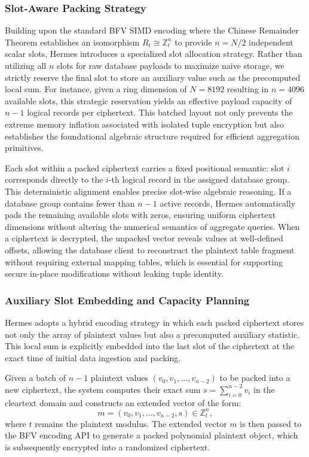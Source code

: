 \documentclass[sigconf,nonacm]{acmart}
\begin{document}
\subsubsection{Slot-Aware Packing Strategy}

Building upon the standard BFV SIMD encoding where the Chinese Remainder Theorem establishes an isomorphism $R_t \cong \mathbb{Z}_t^n$ to provide $n = N/2$ independent scalar slots, Hermes introduces a specialized slot allocation strategy. Rather than utilizing all $n$ slots for raw database payloads to maximize naive storage, we strictly reserve the final slot to store an auxiliary value such as the precomputed local sum. For instance, given a ring dimension of $N=8192$ resulting in $n=4096$ available slots, this strategic reservation yields an effective payload capacity of $n-1$ logical records per ciphertext. This batched layout not only prevents the extreme memory inflation associated with isolated tuple encryption but also establishes the foundational algebraic structure required for efficient aggregation primitives.

Each slot within a packed ciphertext carries a fixed positional semantic: slot $i$ corresponds directly to the $i$-th logical record in the assigned database group. This deterministic alignment enables precise slot-wise algebraic reasoning. If a database group contains fewer than $n-1$ active records, Hermes automatically pads the remaining available slots with zeros, ensuring uniform ciphertext dimensions without altering the numerical semantics of aggregate queries. When a ciphertext is decrypted, the unpacked vector reveals values at well-defined offsets, allowing the database client to reconstruct the plaintext table fragment without requiring external mapping tables, which is essential for supporting secure in-place modifications without leaking tuple identity.

\subsubsection{Auxiliary Slot Embedding and Capacity Planning}

Hermes adopts a hybrid encoding strategy in which each packed ciphertext stores not only the array of plaintext values but also a precomputed auxiliary statistic. This local sum is explicitly embedded into the last slot of the ciphertext at the exact time of initial data ingestion and packing.

Given a batch of $n-1$ plaintext values $(v_0, v_1, \dots, v_{n-2})$ to be packed into a new ciphertext, the system computes their exact sum $s = \sum_{i=0}^{n-2} v_i$ in the cleartext domain and constructs an extended vector of the form:
\[
m = (v_0, v_1, \dots, v_{n-2}, s) \in \mathbb{Z}_t^n,
\]
where $t$ remains the plaintext modulus. The extended vector $m$ is then passed to the BFV encoding API to generate a packed polynomial plaintext object, which is subsequently encrypted into a randomized ciphertext. 
\end{document}
